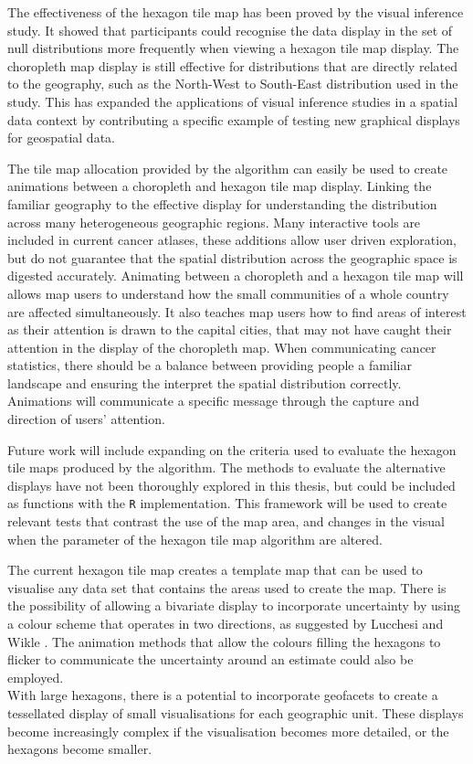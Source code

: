 \documentclass{monashthesis}
\begin{document}
The effectiveness of the hexagon tile map has been proved by the visual inference study. It showed that participants could recognise the data display in the set of null distributions more frequently when viewing a hexagon tile map display. The choropleth map display is still effective for distributions that are directly related to the geography, such as the North-West to South-East distribution used in the study. This has expanded the applications of visual inference studies in a spatial data context by contributing a specific example of testing new graphical displays for geospatial data.

The tile map allocation provided by the algorithm can easily be used to create animations between a choropleth and hexagon tile map display. Linking the familiar geography to the effective display for understanding the distribution across many heterogeneous geographic regions. Many interactive tools are included in current cancer atlases, these additions allow user driven exploration, but do not guarantee that the spatial distribution across the geographic space is digested accurately.
Animating between a choropleth and a hexagon tile map will allows map users to understand how the small communities of a whole country are affected simultaneously. It also teaches map users how to find areas of interest as their attention is drawn to the capital cities, that may not have caught their attention in the display of the choropleth map. When communicating cancer statistics, there should be a balance between providing people a familiar landscape and ensuring the interpret the spatial distribution correctly. Animations will communicate a specific message through the capture and direction of users' attention.

Future work will include expanding on the criteria used to evaluate the hexagon tile maps produced by the algorithm. The methods to evaluate the alternative displays have not been thoroughly explored in this thesis, but could be included as functions with the \texttt{R} implementation. This framework will be used to create relevant tests that contrast the use of the map area, and changes in the visual when the parameter of the hexagon tile map algorithm are altered.

The current hexagon tile map creates a template map that can be used to visualise any data set that contains the areas used to create the map. There is the possibility of allowing a bivariate display to incorporate uncertainty by using a colour scheme that operates in two directions, as suggested by Lucchesi and Wikle \autocite{VUADBC}.
The animation methods that allow the colours filling the hexagons to flicker to communicate the uncertainty around an estimate could also be employed.\\
With large hexagons, there is a potential to incorporate geofacets \autocite{IGF} to create a tessellated display of small visualisations for each geographic unit. These displays become increasingly complex if the visualisation becomes more detailed, or the hexagons become smaller.
\end{document}
